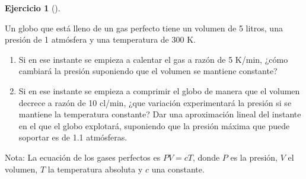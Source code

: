 \documentclass[
  spanish,
  a4paper,
]{scrreport}
\theoremstyle{definition}
\newtheorem{exercise}{Ejercicio}[chapter]
\theoremstyle{remark}
\begin{document}
\begin{exercise}[]\protect\hypertarget{exr-6}{}\label{exr-6}

Un globo que está lleno de un gas perfecto tiene un volumen de 5 litros,
una presión de 1 atmósfera y una temperatura de 300 K.

\begin{enumerate}
\def\labelenumi{\alph{enumi}.}
\item
  Si en ese instante se empieza a calentar el gas a razón de 5 K/min,
  ¿cómo cambiará la presión suponiendo que el volumen se mantiene
  constante?
\item
  Si en ese instante se empieza a comprimir el globo de manera que el
  volumen decrece a razón de 10 cl/min, ¿que variación experimentará la
  presión si se mantiene la temperatura constante? Dar una aproximación
  lineal del instante en el que el globo explotará, suponiendo que la
  presión máxima que puede soportar es de 1.1 atmósferas.
\end{enumerate}

Nota: La ecuación de los gases perfectos es \(PV = cT\), donde \(P\) es
la presión, \(V\) el volumen, \(T\) la temperatura absoluta y \(c\) una
constante.

\end{exercise}
\end{document}
